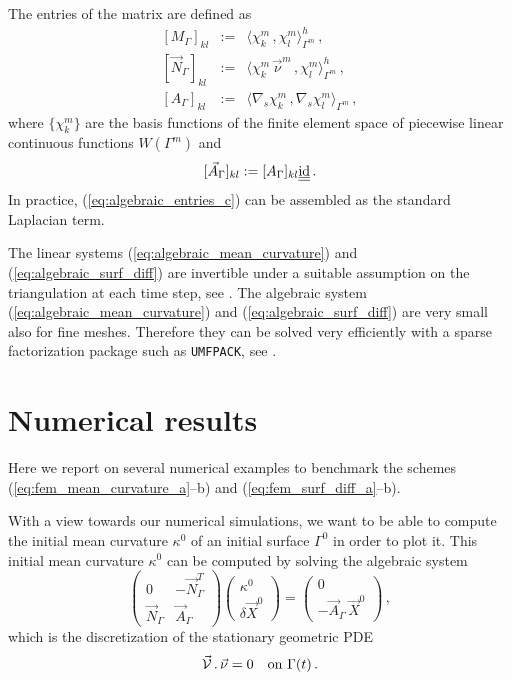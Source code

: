 The entries of the matrix are defined as
\begin{eqnarray}
\left[ M_\Gamma \right]_{kl} & := & \langle \chi_k^m \, , \chi_l^m
\rangle_{\Gamma^m}^h\,,\label{eq:algebraic_entries_a} \\
\left[ \vec N_\Gamma \right]_{kl} & := & \langle \chi_k^m \, \vec{\nu}^m\,,
\chi_l^m \rangle_{\Gamma^m}^h\,,\label{eq:algebraic_entries_b} \\
\left[ A_\Gamma \right]_{kl} & := & \langle \nabla_s \chi_k^m \, , \nabla_s
\chi_l^m \rangle_{\Gamma^m}\,,\label{eq:algebraic_entries_c}
\end{eqnarray}
where $\{\chi_k^m\}$ are the basis functions of the finite element space of
piecewise linear continuous functions $W(\Gamma^m)$ and
\begin{equation}\label{eq:algebraic_entries_d}
[\vec A_\Gamma]_{kl} := [A_\Gamma]_{kl} \mat \id\,.
\end{equation}
In practice, (\ref{eq:algebraic_entries_c}) can be assembled as the standard
Laplacian term.

The linear systems (\ref{eq:algebraic_mean_curvature}) and
(\ref{eq:algebraic_surf_diff}) are invertible under a suitable assumption on the
triangulation at each time step, see \cite{gflows3d}. The algebraic system
(\ref{eq:algebraic_mean_curvature}) and (\ref{eq:algebraic_surf_diff}) are
very small also for fine meshes. Therefore they can be solved very efficiently
with a sparse factorization package such as \verb|UMFPACK|, see \cite{Davis04}.

\section{Numerical results}\label{sec:geometric_pdes_results}
Here we report on several numerical examples to benchmark the schemes
(\ref{eq:fem_mean_curvature_a}--b) and (\ref{eq:fem_surf_diff_a}--b).

With a view towards our numerical simulations, we want to be able to compute
the initial mean curvature $\kappa^0$ of an initial surface $\Gamma^0$ in
order to plot it. This initial mean curvature $\kappa^0$ can be computed by
solving the algebraic system
\begin{equation}\label{eq:algebraic_initial_curvature}
\begin{pmatrix}
0 & -\vec N_\Gamma^{T} \\
\vec{N}_\Gamma & \vec A_\Gamma
\end{pmatrix}
\begin{pmatrix}
\kappa^0 \\
\delta \vec X^0
\end{pmatrix}
=
\begin{pmatrix}
0 \\
- \vec A_\Gamma \, \vec X^0
\end{pmatrix}
\,,
\end{equation}
which is the discretization of the stationary geometric PDE
\begin{equation}
\vec{\mathcal{V}}\,.\,\vec\nu=0\quad\mbox{on }\Gamma(t)\,.
\end{equation}

